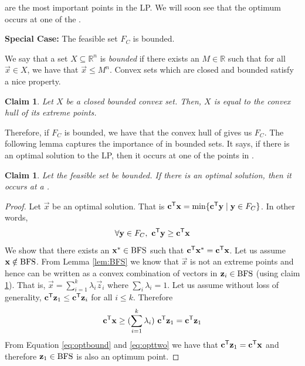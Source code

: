 \documentclass[12pt,
    driverfallback=dvipdfm,
 	openany,
    a4paper,
    toc=bibliography,
    twoside,
    numbers=noenddot]{book}              %
\newtheorem{claim}[theorem]{Claim}
\newcommand{\Reals}{\mathbb{R}}
\newcommand{\Rn}{\Reals^n}
\begin{document}
\BFS are the most important points in the LP. We will soon see that the optimum occurs at one of the \BFS.

\begin{mdframed}[backgroundcolor=light-gray, linecolor=light-gray]
{\bf Special Case:} The feasible set $F_C$ is bounded.

We say that a set $X \subseteq \Rn$ is \emph{bounded} if there exists an $M \in \Reals$ such that for all $\vec x \in X$, we have that $\vec x \leq M^n$. Convex sets which are closed and bounded satisfy a nice property.
\begin{claim}
Let $X$ be a closed bounded convex set. Then, $X$ is equal to the convex hull of its extreme points.
\end{claim}

Therefore, if $F_C$ is bounded, we have that the convex hull of \BFS gives us $F_C$. The following lemma captures the importance of \BFS in bounded sets. It says, if there is an optimal solution to the LP, then it occurs at one of the points in \BFS.
 
\begin{claim}
\label{claim:bounded}
Let the feasible set be bounded. If there is an optimal solution, then it occurs at a \BFS.
\end{claim}
\begin{proof}
Let $\vec x$ be an optimal solution. That is $
{\mathbf c}^{\mathsf{T}} \mathbf x = \min \{{\mathbf c}^{\mathsf{T}} \mathbf y \mid \mathbf y \in F_C\}$. In other words, 
\begin{equation}
\label{eq:optbound}
\forall \mathbf y \in F_C, ~{\mathbf c}^{\mathsf{T}}\mathbf y \geq {\mathbf c}^{\mathsf{T}} \mathbf x
\end{equation}
We show that there exists an $\mathbf x^* \in \mathrm{BFS}$ such that ${\mathbf c}^{\mathsf{T}}{\mathbf x^*}= {\mathbf c}^{\mathsf{T}}\mathbf x$. Let us assume $\mathbf x \notin \mathrm{BFS}$. From Lemma \ref{lem:BFS} we know that $\vec x$ is not an extreme points and hence can be written as a convex combination of vectors in $\mathbf z_i \in \mathrm{BFS}$ (using claim \ref{claim:bounded}). That is, $\vec x = \sum_{i=1}^k \lambda_i \vec z_i$ where $\sum_i \lambda_i = 1$. Let us assume without loss of generality, ${\mathbf c}^{\mathsf{T}}\mathbf z_1 \leq {\mathbf c}^{\mathsf{T}} \mathbf z_i$ for all $i \leq k$. Therefore 
\begin{equation}
\label{eq:opttwo}
{\mathbf c}^{\mathsf{T}} \mathbf x \geq (\sum_{i=1}^k \lambda_i) ~{\mathbf c}^{\mathsf{T}} \mathbf z_1 = {\mathbf c}^{\mathsf{T}} \mathbf z_1
\end{equation}
From Equation \ref{eq:optbound} and \ref{eq:opttwo} we have that ${\mathbf c}^{\mathsf{T}} \mathbf z_1 = {\mathbf c}^{\mathsf{T}} \mathbf x$ and therefore $\mathbf z_1 \in \mathrm{BFS}$ is also an optimum point.
\end{proof}
\end{mdframed}
\end{document}
